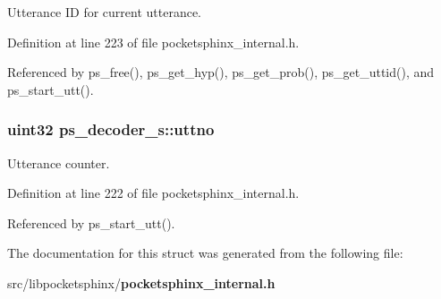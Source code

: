 Utterance I\-D for current utterance. 



Definition at line 223 of file pocketsphinx\-\_\-internal.\-h.



Referenced by ps\-\_\-free(), ps\-\_\-get\-\_\-hyp(), ps\-\_\-get\-\_\-prob(), ps\-\_\-get\-\_\-uttid(), and ps\-\_\-start\-\_\-utt().

\subsubsection[{uttno}]{\setlength{\rightskip}{0pt plus 5cm}uint32 ps\-\_\-decoder\-\_\-s\-::uttno}\label{structps__decoder__s_a0f597370dd162c2799efe216c9b991fc}


Utterance counter. 



Definition at line 222 of file pocketsphinx\-\_\-internal.\-h.



Referenced by ps\-\_\-start\-\_\-utt().



The documentation for this struct was generated from the following file\-:\begin{DoxyCompactItemize}
\item 
src/libpocketsphinx/{\bf pocketsphinx\-\_\-internal.\-h}\end{DoxyCompactItemize}
